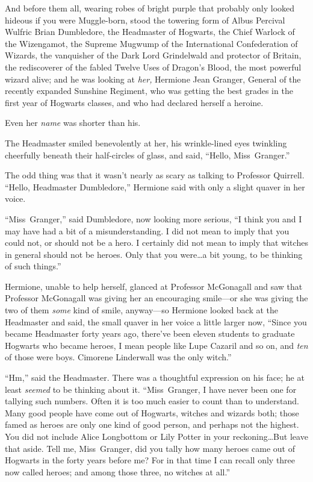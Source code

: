 And before them all, wearing robes of bright purple that probably only looked hideous if you were Muggle-born, stood the towering form of Albus Percival Wulfric Brian Dumbledore, the Headmaster of Hogwarts, the Chief Warlock of the Wizengamot, the Supreme Mugwump of the International Confederation of Wizards, the vanquisher of the Dark Lord Grindelwald and protector of Britain, the rediscoverer of the fabled Twelve Uses of Dragon’s Blood, the most powerful wizard alive; and he was looking at \emph{her,} Hermione Jean Granger, General of the recently expanded Sunshine Regiment, who was getting the best grades in the first year of Hogwarts classes, and who had declared herself a heroine.

Even her \emph{name} was shorter than his.

The Headmaster smiled benevolently at her, his wrinkle-lined eyes twinkling cheerfully beneath their half-circles of glass, and said, “Hello, Miss~Granger.”

The odd thing was that it wasn’t nearly as scary as talking to Professor Quirrell. “Hello, Headmaster Dumbledore,” Hermione said with only a slight quaver in her voice.

“Miss~Granger,” said Dumbledore, now looking more serious, “I think you and I may have had a bit of a misunderstanding. I did not mean to imply that you could not, or should not be a hero. I certainly did not mean to imply that witches in general should not be heroes. Only that you were…a bit young, to be thinking of such things.”

Hermione, unable to help herself, glanced at Professor McGonagall and saw that Professor McGonagall was giving her an encouraging smile—or she was giving the two of them \emph{some} kind of smile, anyway—so Hermione looked back at the Headmaster and said, the small quaver in her voice a little larger now, “Since you became Headmaster forty years ago, there’ve been eleven students to graduate Hogwarts who became heroes, I mean people like Lupe Cazaril and so on, and \emph{ten} of those were boys. Cimorene Linderwall was the only witch.”

“Hm,” said the Headmaster. There was a thoughtful expression on his face; he at least \emph{seemed} to be thinking about it. “Miss~Granger, I have never been one for tallying such numbers. Often it is too much easier to count than to understand. Many good people have come out of Hogwarts, witches and wizards both; those famed as heroes are only one kind of good person, and perhaps not the highest. You did not include Alice Longbottom or Lily Potter in your reckoning…But leave that aside. Tell me, Miss~Granger, did you tally how many heroes came out of Hogwarts in the forty years before me? For in that time I can recall only three now called heroes; and among those three, no witches at all.”

